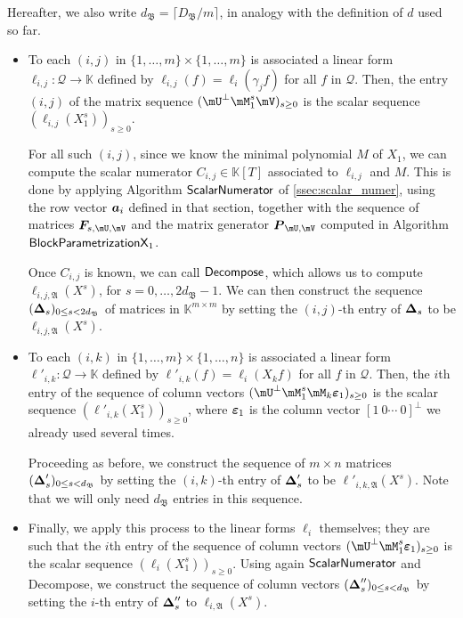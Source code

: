 \documentclass[12pt]{article}
\newcommand{\mat}[1]{\bm{\MakeUppercase{#1}}} %
\newcommand{\row}[1]{\bm{\MakeLowercase{#1}}} %
\newcommand{\col}[1]{\bm{\MakeLowercase{#1}}} %
\newcommand{\seqelt}[1]{\bm{F}_{#1}} %
\newcommand{\mainalgoname}{\mathsf{ BlockParametrization}}
\newcommand{\lf}{X}
\newcommand{\residueI}{\mathscr{Q}}
\def\K{\mathbb{K}}
\def\K {\ensuremath{\mathbb{K}}}
\begin{document}
Hereafter, we also write $d_\mathfrak{B}=\lceil D_\mathfrak{B}/m \rceil$,
in analogy with the definition of $d$ used so far.
\begin{itemize}
\item To each $(i,j)$ in $\{1,\dots,m\}\times \{1,\dots,m\}$ is
  associated a linear form $\ell_{i,j}: \residueI\to \K$ defined by
  $\ell_{i,j}(f) =\ell_i(\gamma_j f)$ for all $f$ in $\residueI$.
  Then, the entry $(i,j)$ of the matrix sequence $(\mU^\perp \mM_1^s
  \mV)_{s \ge0}$ is the scalar sequence $(\ell_{i,j}(X_1^s))_{s \ge
    0}$.

\smallskip

  For all such $(i,j)$, since we know the minimal polynomial $M$ of
  $X_1$, we can compute the scalar numerator $C_{i,j} \in \K[T]$
  associated to $\ell_{i,j}$ and $M$. This is done by applying
  Algorithm $\mathsf{{\sf ScalarNumerator}}$ of
  \cref{ssec:scalar_numer}, using the row vector $\row{a}_i$ defined
  in that section, together with the sequence of matrices
  $\seqelt{s,\mU,\mV}$ and the matrix generator $\mat{P}_{\mU,\mV}$
computed in Algorithm $\mainalgoname{\sf X}_1$.

\smallskip

Once $C_{i,j}$ is known, we can call ${\sf Decompose}$, which allows us
to compute $\ell_{i,j,\mathfrak{A}}(\lf^s)$, for
$s=0,\dots,2d_\mathfrak{B}-1$.  We can then construct the sequence
$(\mat{\Delta}_s)_{0 \le s < 2d_\mathfrak{B}}$ of matrices in
$\K^{m\times m}$ by setting the $(i,j)$-th entry of $\mat{\Delta}_s$
to be $\ell_{i,j,\mathfrak{A}}(\lf^s)$.

\smallskip

\item To each $(i,k)$ in $\{1,\dots,m\}\times \{1,\dots,n\}$ is
  associated a linear form $\ell'_{i,k}: \residueI\to \K$ defined by
  $\ell'_{i,k}(f) =\ell_i(X_k f)$ for all $f$ in $\residueI$.  Then,
  the $i$th entry of the sequence of column vectors $(\mU^\perp
  \mM_1^s \mM_k \col{\varepsilon}_1)_{s \ge0}$ is the scalar sequence
  $(\ell'_{i,k}(X_1^s))_{s \ge 0}$, where $\col{\varepsilon}_1$ is the
  column vector $[1~0\cdots~0]^\perp$ we already used several times.

\smallskip

  Proceeding as before, we construct the sequence of $m \times n$ matrices
  $(\mat{\Delta}'_s)_{0 \le s < d_\mathfrak{B}}$ by setting the
  $(i,k)$-th entry of $\mat{\Delta}'_s$ to be
  $\ell'_{i,k,\mathfrak{A}}(\lf^s)$. Note that we will only need $d_\mathfrak{B}$
  entries in this sequence.

\smallskip

\item Finally, we apply this process to the linear forms $\ell_i$
  themselves; they are such that the $i$th entry of the sequence of
  column vectors $(\mU^\perp \mM_1^s \col{\varepsilon}_1)_{s \ge0}$ is
  the scalar sequence $(\ell_{i}(X_1^s))_{s \ge 0}$. Using again
  $\mathsf{{\sf ScalarNumerator}}$ and {\sf Decompose}, we construct
  the sequence of column vectors $(\mat{\Delta}''_s)_{0 \le s <
    d_\mathfrak{B}}$ by setting the $i$-th entry of $\mat{\Delta}''_s$
  to $\ell_{i,\mathfrak{A}}(\lf^s)$.
\end{itemize}
\end{document}
